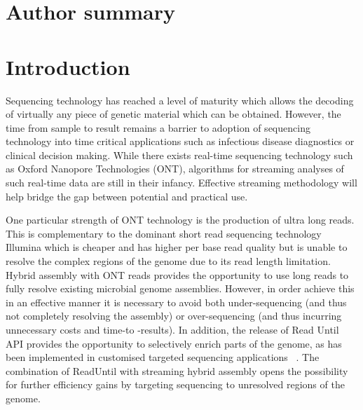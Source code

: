 \documentclass[10pt,letterpaper]{article}
\begin{document}
\section*{Author summary}


\linenumbers

\section*{Introduction}

Sequencing technology has reached a level of maturity which allows the decoding of virtually any piece of genetic material which  can be obtained. 
However, the time from sample to result remains a barrier to adoption of sequencing technology into time critical applications such as infectious disease diagnostics or clinical decision making. 
While there exists real-time sequencing technology such as Oxford Nanopore Technologies (ONT), algorithms for streaming analyses of such real-time data are still in their infancy. Effective streaming methodology will help bridge the gap between potential and practical use. 


One particular strength of ONT technology is the production of ultra long reads. 
This is complementary to the dominant short read sequencing technology Illumina which is cheaper and has higher per base read quality but is unable to resolve the complex regions of the genome due to its read length limitation. 
Hybrid assembly with ONT reads provides the opportunity to use long reads to fully resolve existing microbial genome assemblies. However, in order achieve this in an effective manner it is necessary to avoid both under-sequencing (and thus not completely resolving the assembly) or over-sequencing (and thus incurring unnecessary costs and time-to -results).  In addition, the release of Read Until API provides the opportunity to selectively enrich parts of the genome, as has been implemented in customised targeted sequencing applications ~\cite{Payne2020}.   The combination of ReadUntil with  streaming hybrid assembly opens the possibility for further efficiency gains by targeting sequencing to unresolved regions of the genome.
\end{document}
